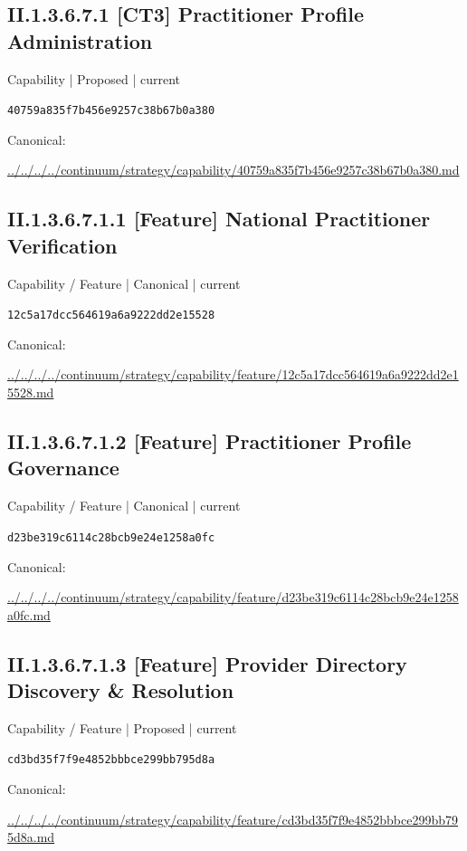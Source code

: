 \documentclass[10pt,a4paper]{article}
\begin{document}
\subsection*{II.1.3.6.7.1 [CT3] Practitioner Profile Administration}
{\small Capability | Proposed | current}\par
\texttt{40759a835f7b456e9257c38b67b0a380}\par
Canonical: \par
{\footnotesize\url{../../../../continuum/strategy/capability/40759a835f7b456e9257c38b67b0a380.md}}\par
\subsection*{II.1.3.6.7.1.1 [Feature] National Practitioner Verification}
{\small Capability / Feature | Canonical | current}\par
\texttt{12c5a17dcc564619a6a9222dd2e15528}\par
Canonical: \par
{\footnotesize\url{../../../../continuum/strategy/capability/feature/12c5a17dcc564619a6a9222dd2e15528.md}}\par
\subsection*{II.1.3.6.7.1.2 [Feature] Practitioner Profile Governance}
{\small Capability / Feature | Canonical | current}\par
\texttt{d23be319c6114c28bcb9e24e1258a0fc}\par
Canonical: \par
{\footnotesize\url{../../../../continuum/strategy/capability/feature/d23be319c6114c28bcb9e24e1258a0fc.md}}\par
\subsection*{II.1.3.6.7.1.3 [Feature] Provider Directory Discovery \& Resolution}
{\small Capability / Feature | Proposed | current}\par
\texttt{cd3bd35f7f9e4852bbbce299bb795d8a}\par
Canonical: \par
{\footnotesize\url{../../../../continuum/strategy/capability/feature/cd3bd35f7f9e4852bbbce299bb795d8a.md}}\par
\end{document}
